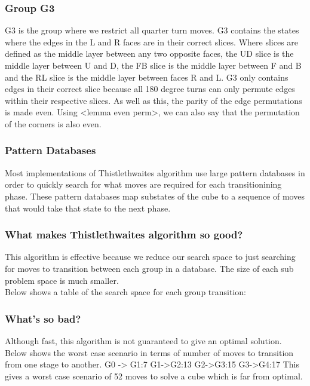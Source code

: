 \documentclass[titlepage]{report}[12pt]
\begin{document}
\subsubsection{Group G3} 
G3 is the group where we restrict all quarter turn moves. G3 contains the states where the edges in the L and R faces are in their correct slices. Where slices are defined as the middle layer between any two opposite faces, the UD slice is the middle layer between U and D, the FB slice is the middle layer between F and B and the RL slice is the middle layer between faces R and L. G3 only contains edges in their correct slice because all 180 degree turns can only permute edges within their respective slices. As well as this, the parity of the edge permutations is made even. Using <lemma even perm>, we can also say that the permutation of the corners is also even.

\subsubsection{Pattern Databases}
Most implementations of Thistlethwaites algorithm use large pattern databases in order to quickly search for what moves are required for each transitionining phase. These pattern databases map substates of the cube to a sequence of moves that would take that state to the next phase.

\subsubsection {What makes Thistlethwaites algorithm so good?} 
This algorithm is effective because we reduce our search space to just searching for moves to transition between each group in a database. The size of each sub problem space is much smaller.
\\Below shows a table of the search space for each group transition:
\subsubsection{What's so bad?}
Although fast, this algorithm is not guaranteed to give an optimal solution. Below shows the worst case scenario in terms of number of moves to transition from one stage to another.
G0 -> G1:7 G1->G2:13 G2->G3:15 G3->G4:17
This gives a worst case scenario of 52 moves to solve a cube which is far from optimal.
\end{document}
